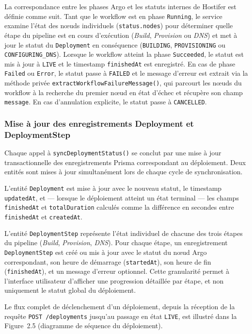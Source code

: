 La correspondance entre les phases Argo et les statuts internes de Hostifer est définie comme suit. Tant que le workflow est en phase \texttt{Running}, le service examine l'état des nœuds individuels (\texttt{status.nodes}) pour déterminer quelle étape du pipeline est en cours d'exécution (\textit{Build}, \textit{Provision} ou \textit{DNS}) et met à jour le statut du \texttt{Deployment} en conséquence (\texttt{BUILDING}, \texttt{PROVISIONING} ou \texttt{CONFIGURING\_DNS}). Lorsque le workflow atteint la phase \texttt{Succeeded}, le statut est mis à jour à \texttt{LIVE} et le timestamp \texttt{finishedAt} est enregistré. En cas de phase \texttt{Failed} ou \texttt{Error}, le statut passe à \texttt{FAILED} et le message d'erreur est extrait via la méthode privée \texttt{extractWorkflowFailureMessage()}, qui parcourt les nœuds du workflow à la recherche du premier nœud en état d'échec et récupère son champ \texttt{message}. En cas d'annulation explicite, le statut passe à \texttt{CANCELLED}.

\subsubsection*{Mise à jour des enregistrements Deployment et DeploymentStep}

Chaque appel à \texttt{syncDeploymentStatus()} se conclut par une mise à jour transactionnelle des enregistrements Prisma correspondant au déploiement. Deux entités sont mises à jour simultanément lors de chaque cycle de synchronisation.

L'entité \texttt{Deployment} est mise à jour avec le nouveau statut, le timestamp \texttt{updatedAt}, et — lorsque le déploiement atteint un état terminal — les champs \texttt{finishedAt} et \texttt{totalDuration} calculés comme la différence en secondes entre \texttt{finishedAt} et \texttt{createdAt}.

L'entité \texttt{DeploymentStep} représente l'état individuel de chacune des trois étapes du pipeline (\textit{Build}, \textit{Provision}, \textit{DNS}). Pour chaque étape, un enregistrement \texttt{DeploymentStep} est créé ou mis à jour avec le statut du nœud Argo correspondant, son heure de démarrage (\texttt{startedAt}), son heure de fin (\texttt{finishedAt}), et un message d'erreur optionnel. Cette granularité permet à l'interface utilisateur d'afficher une progression détaillée par étape, et non uniquement le statut global du déploiement.

Le flux complet de déclenchement d'un déploiement, depuis la réception de la requête \texttt{POST /deployments} jusqu'au passage en état \texttt{LIVE}, est illustré dans la Figure~2.5 (diagramme de séquence du déploiement).

